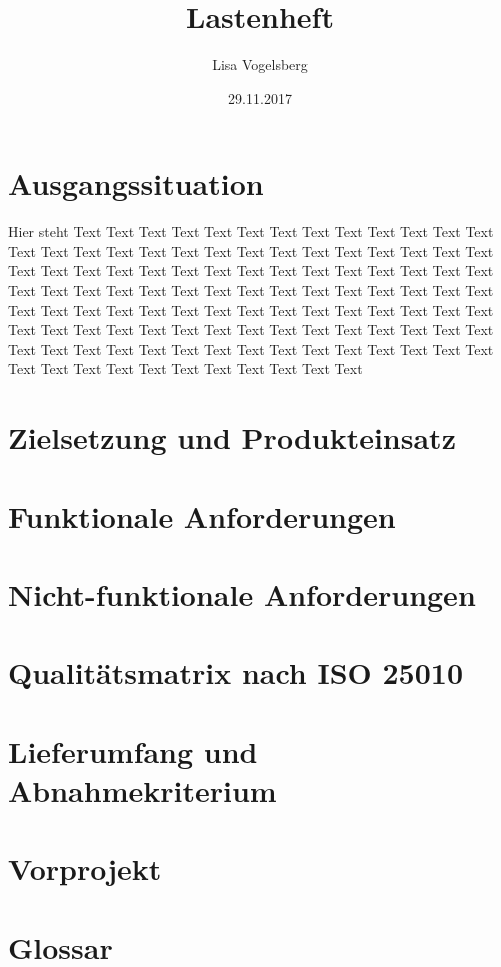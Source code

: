 \documentclass[11pt,a4paper]{scrreprt}
\title{Lastenheft}
\author{Lisa Vogelsberg}
\date{29.11.2017}
\begin{document}
\tableofcontents
\chapter{Ausgangssituation}
Hier steht Text Text Text Text Text Text Text Text Text Text Text Text Text Text Text Text Text Text Text Text Text Text Text Text Text Text Text Text Text Text Text Text Text Text Text Text Text Text Text Text Text Text Text Text Text Text Text Text Text Text Text Text Text Text Text Text Text Text Text Text Text Text Text Text Text Text Text Text Text Text Text Text Text Text Text Text Text Text Text Text Text Text Text Text Text Text Text Text Text Text Text Text Text Text Text Text Text Text Text Text Text Text Text Text Text Text Text Text Text Text Text Text Text Text
\chapter{Zielsetzung und Produkteinsatz}
\chapter{Funktionale Anforderungen}
\chapter{Nicht-funktionale Anforderungen}
\chapter{Qualitätsmatrix nach ISO 25010}
\chapter{Lieferumfang und Abnahmekriterium}
\chapter{Vorprojekt}
\chapter{Glossar}
\end{document}
